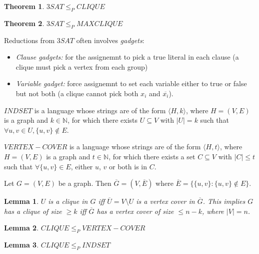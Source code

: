 \documentclass[letterpaper,landscape,11pt]{article}
\newtheorem{theorem}{Theorem}
\newtheorem{lemma}{Lemma}
\begin{document}
\begin{theorem}
	$3SAT \leq_P CLIQUE$
\end{theorem}

\begin{theorem}
	$3SAT \leq_P MAXCLIQUE$
\end{theorem}

Reductions from $3SAT$ often involves \emph{gadgets}:
\begin{itemize}
	\item \emph{Clause gadgets:} for the assignemnt to pick a true literal in each clause (a clique must pick a vertex from each group)
	\item \emph{Variable gadget:} force assignemnt to set each variable either to true or false but not both (a clique cannot pick both $x_i$ and $\overline{x_i}$).
\end{itemize}

$INDSET$ is a language whose strings are of the form $\langle H, k \rangle$, where $H = (V, E)$ is a graph and $k \in \mathbb{N}$, for which there exists $U \subseteq V$ with $|U| = k$ such that $\forall u, v \in U, \{u, v\} \notin E$.

$VERTEX-COVER$ is a language whose strings are of the form $\langle H, t \rangle$, where $H = (V, E)$ is a graph and $t \in \mathbb{N}$, for which there exists a set $C \subseteq V$ with $|C| \leq t$ such that $\forall \{u, v\} \in E$, either $u$, $v$ or both is in $C$.

Let $G = (V, E)$ be a graph. Then $\overline{G} = (V, \overline{E})$ where $\overline{E} = \{\{u, v\} : \{u, v\} \notin E\}$.

\begin{lemma}
	$U$ is a clique in $G$ iff $\overline{U} = V \setminus U$ is a vertex cover in $\overline{G}$. This implies $G$ has a clique of size $\geq k$ iff $\overline{G}$ has a vertex cover of size $\leq n - k$, where $|V| = n$.
\end{lemma}

\begin{lemma}
	$CLIQUE \leq_P VERTEX-COVER$
\end{lemma}

\begin{lemma}
	$CLIQUE \leq_P INDSET$
\end{lemma}
\end{document}
